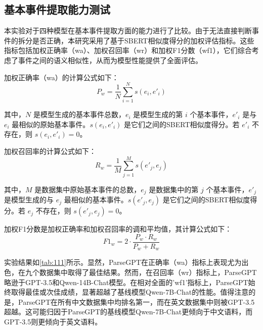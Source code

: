 \subsection{基本事件提取能力测试}

本实验对于四种模型在基本事件提取方面的能力进行了比较。由于无法直接判断事件的拆分是否正确，本研究采用了基于SBERT相似度得分的加权评估指标。这些指标包括加权正确率（wa）、加权召回率（wr）和加权F1分数（wf1），它们综合考虑了事件之间的语义相似性，从而为模型性能提供了全面评估。

加权正确率（wa）的计算公式如下：
\[ P_w = \frac{1}{N} \sum_{i=1}^{N} s(e_i, e'_i) \]

其中，\( N \) 是模型生成的基本事件总数，\( e_i \) 是模型生成的第 \( i \) 个基本事件，\( e'_i \) 是与 \( e_i \) 最相似的原始基本事件。\( s(e_i, e'_i) \) 是它们之间的SBERT相似度得分。若 \( e'_i \) 不存在，则 \( s(e_i, e'_i) = 0 \)。

加权召回率的计算公式如下：
\[ R_w = \frac{1}{M} \sum_{j=1}^{M} s(e'_j, e_j) \]

其中，\( M \) 是数据集中原始基本事件的总数，\( e_j \) 是数据集中的第 \( j \) 个基本事件，\( e'_j \) 是模型生成的与 \( e_j \) 最相似的基本事件。\( s(e'_j, e_j) \) 是它们之间的SBERT相似度得分。若 \( e_j \) 不存在，则 \( s(e'_j, e_j) = 0 \)。

加权F1分数是加权正确率和加权召回率的调和平均值，其计算公式如下：
\[ F1_w = 2 \cdot \frac{P_w \cdot R_w}{P_w + R_w} \]

实验结果如\autoref{tab:111}所示。显然，ParseGPT在正确率（wa）指标上表现尤为出色，在九个数据集中取得了最佳结果。然而，在召回率（wr）指标上，ParseGPT略逊于GPT-3.5和Qwen-14B-Chat模型。在相对全面的'wf1'指标上，ParseGPT始终取得最佳或次佳成绩，显著超越了基线模型Qwen-7B-Chat的性能。值得注意的是，ParseGPT在所有中文数据集中均排名第一，而在英文数据集中则被GPT-3.5超越。这可能归因于ParseGPT的基线模型Qwen-7B-Chat更倾向于中文语料，而GPT-3.5则更倾向于英文语料。

